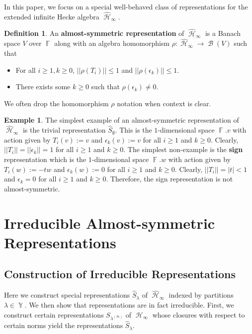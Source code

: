 \documentclass[12pt,reqno]{amsart}
\theoremstyle{definition}
\newtheorem{defn}[thm]{Definition}
\newtheorem{example}{Example}
\DeclareMathOperator{\bF}{\mathbb{F}}
\DeclareMathOperator{\cH}{\mathcal{H}}
\DeclareMathOperator{\cB}{\mathcal{B}}
\DeclareMathOperator{\Par}{\mathbb{Y}}
\begin{document}
In this paper, we focus on a special well-behaved class of representations for the extended infinite Hecke algebra $\widehat{\cH}_{\infty}.$

\begin{defn}\label{defn almost-symm}
    An \textbf{almost-symmetric representation} of $\widehat{\cH}_{\infty}$ is a Banach space $V$ over $\bF$ along with an algebra homomorphism $\rho: \widehat{\cH}_{\infty} \rightarrow \cB(V)$ such that 
    \begin{itemize}
        \item For all $i \geq 1,k \geq 0$, $||\rho(T_i)|| \leq 1$ and $||\rho(\epsilon_k)|| \leq 1.$
        \item There exists some $k \geq 0$ such that $\rho(\epsilon_k) \neq 0.$
    \end{itemize}
\end{defn}

We often drop the homomorphism $\rho$ notation when context is clear.

\begin{example}
    The simplest example of an almost-symmetric representation of $\widehat{\cH}_{\infty}$ is the trivial representation $\hat{S}_{\emptyset}$. This is the $1$-dimensional space $\bF.v$ with action given by $T_i(v):= v$ and $\epsilon_{k}(v):= v$ for all $i \geq 1$ and $k \geq 0.$ Clearly, $||T_i|| = ||\epsilon_k|| =1$ for all $i \geq 1$ and $k \geq 0.$ The simplest non-example is the \textbf{sign} representation which is the $1$-dimensional space $\bF.w$ with action given by $T_i(w):= -tw$ and $\epsilon_{k}(w) := 0$ for all $i \geq 1$ and $k \geq 0.$ Clearly, $||T_i|| = |t| < 1$ and $\epsilon_k =0$ for all $i \geq 1$ and $k \geq 0.$ Therefore, the sign representation is not almost-symmetric. 
\end{example}


\section{Irreducible Almost-symmetric Representations}

\subsection{Construction of Irreducible Representations}

Here we construct special representations $\hat{S}_{\lambda}$ of $\widehat{\cH}_{\infty}$ indexed by partitions $\lambda \in \Par$. We then show that representations are in fact irreducible. First, we construct certain representations $S_{\lambda^{(\infty)}}$ of $\cH_{\infty}$ whose closures with respect to certain norms yield the representations $\hat{S}_{\lambda}.$
\end{document}
